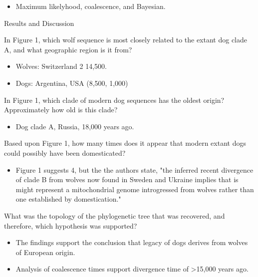 \documentclass[12pt,a4paper]{article}
\begin{document}
\begin{itemize}
\begin{itemize}
                \begin{itemize}
                    \item Maximum likelyhood, coalescence, and Bayesian.
                \end{itemize}
        \end{itemize}
    \item Results and Discussion
        \begin{itemize}
            {\color{darklc} \item In Figure 1, which wolf sequence is most closely related to the extant dog clade A, and what geographic region is it from?}
                \begin{itemize}
                    \item Wolves: Switzerland 2 14,500.
                    \item Dogs: Argentina, USA (8,500, 1,000) 
                \end{itemize}
            {\color{darklc} \item In Figure 1, which clade of modern dog sequences has the oldest origin? Approximately how old is this clade?}
                \begin{itemize}
                    \item Dog clade A, Russia, 18,000 years ago.
                \end{itemize}
            {\color{darklc} \item Based upon Figure 1, how many times does it appear that modern extant dogs could possibly have been domesticated?}
                \begin{itemize}
                    \item Figure 1 suggests 4, but the the authors state, {\color{G-Moon}"the inferred recent divergence of clade B from wolves now found in Sweden and Ukraine implies that is might represent a mitochondrial genome introgressed from wolves rather than one established by domestication."}
                \end{itemize}
            {\color{darklc} \item What was the topology of the phylogenetic tree that was recovered, and therefore, which hypothesis was supported?}
                \begin{itemize}
                    \item The findings support the conclusion that legacy of dogs derives from wolves of European origin.
                    \item Analysis of coalescence times support divergence time of >15,000 years ago.

\end{itemize}
\end{itemize}
\end{itemize}
\end{document}
